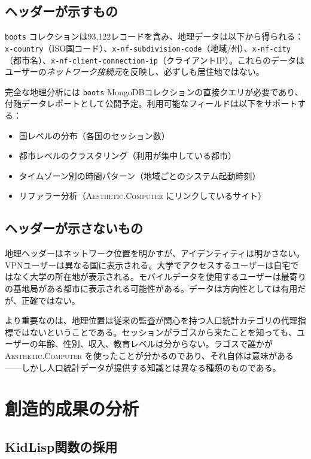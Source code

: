 \documentclass[10pt,letterpaper,twocolumn]{article}
\newcommand{\ac}{\textsc{Aesthetic.Computer}}
\begin{document}
\subsection{ヘッダーが示すもの}

\texttt{boots} コレクションは93,122レコードを含み、地理データは以下から得られる：\texttt{x-country}（ISO国コード）、\texttt{x-nf-subdivision-code}（地域/州）、\texttt{x-nf-city}（都市名）、\texttt{x-nf-client-connection-ip}（クライアントIP）。これらのデータはユーザーの\emph{ネットワーク接続元}を反映し、必ずしも居住地ではない。

完全な地理分析には \texttt{boots} MongoDBコレクションの直接クエリが必要であり、付随データレポートとして公開予定。利用可能なフィールドは以下をサポートする：

\begin{itemize}
  \item 国レベルの分布（各国のセッション数）
  \item 都市レベルのクラスタリング（利用が集中している都市）
  \item タイムゾーン別の時間パターン（地域ごとのシステム起動時刻）
  \item リファラー分析（\ac{} にリンクしているサイト）
\end{itemize}

\subsection{ヘッダーが示さないもの}

地理ヘッダーはネットワーク位置を明かすが、アイデンティティは明かさない。VPNユーザーは異なる国に表示される。大学でアクセスするユーザーは自宅ではなく大学の所在地が表示される。モバイルデータを使用するユーザーは最寄りの基地局がある都市に表示される可能性がある。データは方向性としては有用だが、正確ではない。

より重要なのは、地理位置は従来の監査が関心を持つ人口統計カテゴリの代理指標ではないということである。セッションがラゴスから来たことを知っても、ユーザーの年齢、性別、収入、教育レベルは分からない。ラゴスで誰かが \ac{} を使ったことが分かるのであり、それ自体は意味がある——しかし人口統計データが提供する知識とは異なる種類のものである。

\section{創造的成果の分析}

\subsection{KidLisp関数の採用}
\end{document}
